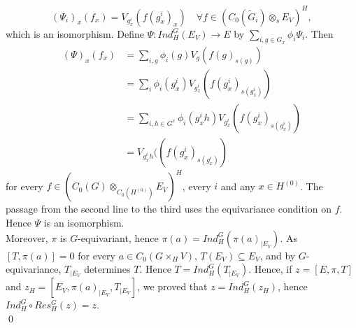 \begin{dem}
\[ (\Psi_i)_x(f_x) = V_{g^{i}_x}\left( f(g^{i}_{x})_x \right)\quad \forall f\in \left( C_0(\tilde G_i)\otimes_s E_V\right)^H, \]
which is an isomorphism. Define $\Psi : Ind_H^G (E_V)\rightarrow E$ by $\sum_{i,g\in G_x}\phi_i \Psi_i$. Then 
\[\begin{array}{rl}
(\Psi)_x(f_x) & = \sum_{i,g}\phi_i(g)V_g(f(g)_{s(g)}) \\
		& = \sum_{i}\phi_i(g^i_x)V_{g^i_x}(f(g^i_x)_{s(g^i_x)}) \\
		& = \sum_{i, h\in G^x}\phi_i(g^i_x h)V_{g^i_x}(f(g^i_x)_{s(g^i_x)}) \\
		& = V_{g^i_x h}((f(g^i_x)_{s(g^i_x)})
\end{array}
\]
for every $f\in \left( C_0( G)\otimes_{C_0(H^{(0)})} E_V\right)^H$, every $i$ and any $x\in H^{(0)}$. The passage from the second line to the third uses the equivariance condition on $f$. Hence $\Psi$ is an isomorphism.\\ 

Moreover, $\pi$ is $G$-equivariant, hence $\pi(a) = Ind_H^G (\pi(a)_{|E_V} )$. As $[T,\pi(a)]=0$ for every $a\in C_0(G\times_H V)$, $T(E_V)\subseteq E_V$, and by $G$-equivariance, $T_{|E_V}$ determines $T$. Hence $T= Ind_H^G (T_{|E_V})$. Hence, if $z=[E,\pi,T]$ and $z_H =[E_V,\pi(a)_{|E_V},T_{|E_V}]$, we proved that $z = Ind_H^G( z_H)$, hence $Ind_H^G \circ Res_H^G (z)= z$.\\
\qed  
\end{dem}



